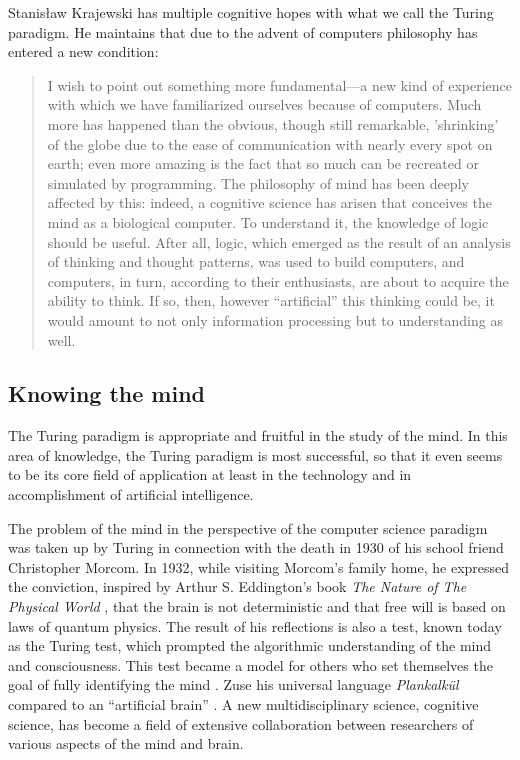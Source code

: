 \documentclass[pdftex,12pt]{article}
\begin{document}
Stanisław Krajewski \parencite*{Krajewski2012} has multiple cognitive hopes with what we call the Turing paradigm. He maintains that  due to the advent of computers philosophy has entered a new condition: \begin{quote} \small  I wish to point out something more fundamental---a new kind of experience with which we have familiarized ourselves because of computers. Much more has happened than the obvious, though still remarkable, 'shrinking' of the globe due to the ease of communication with nearly every spot on earth; even more amazing is the fact that so much can be recreated or simulated by programming. The philosophy of mind has been deeply affected by this: indeed, a cognitive science has arisen that conceives the mind as a biological computer. To understand it, the knowledge of logic should be useful. After all, logic, which emerged as the result of an analysis of thinking and thought patterns, was used to build computers, and computers, in turn, according to their enthusiasts, are about to acquire the ability to think. If so, then, however ``artificial'' this thinking could be, it would amount to not only information processing but to understanding as well. \end{quote}



\subsection{Knowing the mind} The Turing paradigm is appropriate and fruitful in the study of the mind. In this area of knowledge, the Turing paradigm is most successful, so that it even seems to be its core field of application at least in the technology and in accomplishment of artificial intelligence.

The problem of the mind in the perspective of the computer science paradigm was taken up by Turing in connection with the death in 1930 of his school friend Christopher Morcom. In 1932, while visiting Morcom's family home, he expressed the conviction, inspired by Arthur S. Eddington's book \emph{The Nature of The Physical World} \parencite*{Eddington2014}, that the brain is not deterministic and that free will is based on laws of quantum physics. The result of his reflections is also a test, known today as the Turing test, which prompted the algorithmic understanding of the mind and consciousness. This test became a model for others who set themselves the goal of fully identifying the mind \parencite{Krajewski2012}. Zuse his universal language \textit{Plankalk{\"u}l} compared to an ``artificial brain'' \parencite[p.62]{German2012}. A new multidisciplinary science, cognitive science, has become a field of extensive collaboration between researchers of various aspects of the mind and brain.
\end{document}
